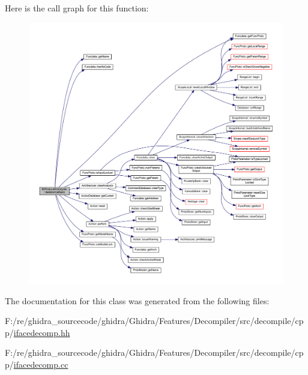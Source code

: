 Here is the call graph for this function\+:
\nopagebreak
\begin{figure}[H]
\begin{center}
\leavevmode
\includegraphics[width=350pt]{class_ifc_produce_prototypes_abff378a291a5e7dd0c24d8ced5c9c4ea_cgraph}
\end{center}
\end{figure}


The documentation for this class was generated from the following files\+:\begin{DoxyCompactItemize}
\item 
F\+:/re/ghidra\+\_\+sourcecode/ghidra/\+Ghidra/\+Features/\+Decompiler/src/decompile/cpp/\mbox{\hyperlink{ifacedecomp_8hh}{ifacedecomp.\+hh}}\item 
F\+:/re/ghidra\+\_\+sourcecode/ghidra/\+Ghidra/\+Features/\+Decompiler/src/decompile/cpp/\mbox{\hyperlink{ifacedecomp_8cc}{ifacedecomp.\+cc}}\end{DoxyCompactItemize}
